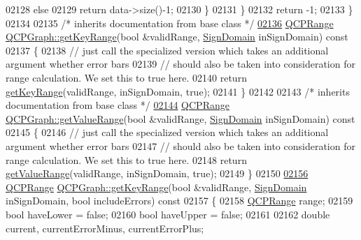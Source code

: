 \begin{DoxyCode}
02128       \textcolor{keywordflow}{else}
02129         \textcolor{keywordflow}{return} data->size()-1;
02130     \}
02131   \}
02132   \textcolor{keywordflow}{return} -1;
02133 \}
02134 
02135 \textcolor{comment}{/* inherits documentation from base class */}
\hypertarget{a00115_source_l02136}{}\hyperlink{a00031_ab39c7e8c94b64804a8dc9c19bc7d4683}{02136} \hyperlink{a00049}{QCPRange} \hyperlink{a00031_ab39c7e8c94b64804a8dc9c19bc7d4683}{QCPGraph::getKeyRange}(\textcolor{keywordtype}{bool} &validRange, 
      \hyperlink{a00024_a661743478a1d3c09d28ec2711d7653d8}{SignDomain} inSignDomain)\textcolor{keyword}{ const}
02137 \textcolor{keyword}{}\{
02138   \textcolor{comment}{// just call the specialized version which takes an additional argument whether error bars}
02139   \textcolor{comment}{// should also be taken into consideration for range calculation. We set this to true here.}
02140   \textcolor{keywordflow}{return} \hyperlink{a00031_ab39c7e8c94b64804a8dc9c19bc7d4683}{getKeyRange}(validRange, inSignDomain, \textcolor{keyword}{true});
02141 \}
02142 
02143 \textcolor{comment}{/* inherits documentation from base class */}
\hypertarget{a00115_source_l02144}{}\hyperlink{a00031_a9fc0c1288455fa5bb64b603d6b01de6c}{02144} \hyperlink{a00049}{QCPRange} \hyperlink{a00031_a9fc0c1288455fa5bb64b603d6b01de6c}{QCPGraph::getValueRange}(\textcolor{keywordtype}{bool} &validRange, 
      \hyperlink{a00024_a661743478a1d3c09d28ec2711d7653d8}{SignDomain} inSignDomain)\textcolor{keyword}{ const}
02145 \textcolor{keyword}{}\{
02146   \textcolor{comment}{// just call the specialized version which takes an additional argument whether error bars}
02147   \textcolor{comment}{// should also be taken into consideration for range calculation. We set this to true here.}
02148   \textcolor{keywordflow}{return} \hyperlink{a00031_a9fc0c1288455fa5bb64b603d6b01de6c}{getValueRange}(validRange, inSignDomain, \textcolor{keyword}{true});
02149 \}
02150 
\hypertarget{a00115_source_l02156}{}\hyperlink{a00031_a3a69fbbaea30050a9cfe335a9a01cbf2}{02156} \hyperlink{a00049}{QCPRange} \hyperlink{a00031_ab39c7e8c94b64804a8dc9c19bc7d4683}{QCPGraph::getKeyRange}(\textcolor{keywordtype}{bool} &validRange, 
      \hyperlink{a00024_a661743478a1d3c09d28ec2711d7653d8}{SignDomain} inSignDomain, \textcolor{keywordtype}{bool} includeErrors)\textcolor{keyword}{ const}
02157 \textcolor{keyword}{}\{
02158   \hyperlink{a00049}{QCPRange} range;
02159   \textcolor{keywordtype}{bool} haveLower = \textcolor{keyword}{false};
02160   \textcolor{keywordtype}{bool} haveUpper = \textcolor{keyword}{false};
02161   
02162   \textcolor{keywordtype}{double} current, currentErrorMinus, currentErrorPlus;

\end{DoxyCode}
